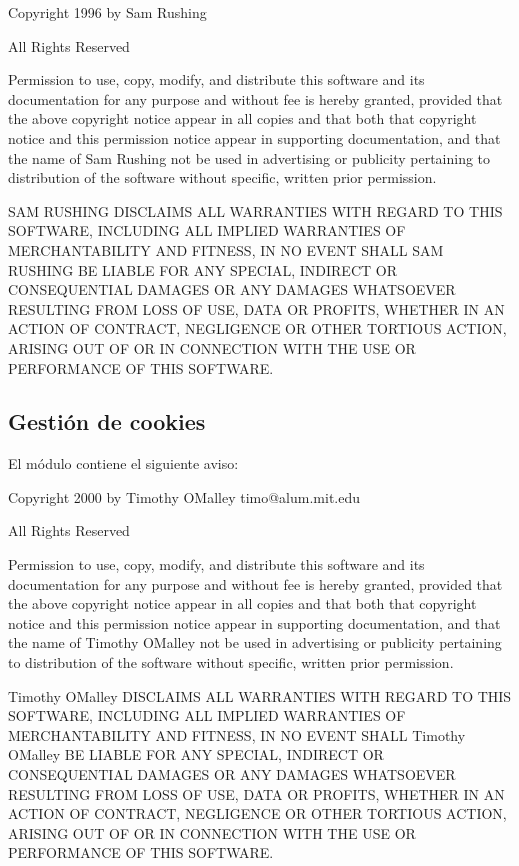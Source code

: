 \documentclass[a4,10pt,spanish]{sphinxmanual}
\begin{document}
\begin{sphinxVerbatim}[commandchars=\\\{\}]
Copyright 1996 by Sam Rushing

                        All Rights Reserved

Permission to use, copy, modify, and distribute this software and
its documentation for any purpose and without fee is hereby
granted, provided that the above copyright notice appear in all
copies and that both that copyright notice and this permission
notice appear in supporting documentation, and that the name of Sam
Rushing not be used in advertising or publicity pertaining to
distribution of the software without specific, written prior
permission.

SAM RUSHING DISCLAIMS ALL WARRANTIES WITH REGARD TO THIS SOFTWARE,
INCLUDING ALL IMPLIED WARRANTIES OF MERCHANTABILITY AND FITNESS, IN
NO EVENT SHALL SAM RUSHING BE LIABLE FOR ANY SPECIAL, INDIRECT OR
CONSEQUENTIAL DAMAGES OR ANY DAMAGES WHATSOEVER RESULTING FROM LOSS
OF USE, DATA OR PROFITS, WHETHER IN AN ACTION OF CONTRACT,
NEGLIGENCE OR OTHER TORTIOUS ACTION, ARISING OUT OF OR IN
CONNECTION WITH THE USE OR PERFORMANCE OF THIS SOFTWARE.
\end{sphinxVerbatim}


\subsection{Gestión de cookies}
\label{\detokenize{license:cookie-management}}
\sphinxAtStartPar
El módulo  contiene el siguiente aviso:

\begin{sphinxVerbatim}[commandchars=\\\{\}]
Copyright 2000 by Timothy O\PYGZsq{}Malley \PYGZlt{}timo@alum.mit.edu\PYGZgt{}

               All Rights Reserved

Permission to use, copy, modify, and distribute this software
and its documentation for any purpose and without fee is hereby
granted, provided that the above copyright notice appear in all
copies and that both that copyright notice and this permission
notice appear in supporting documentation, and that the name of
Timothy O\PYGZsq{}Malley  not be used in advertising or publicity
pertaining to distribution of the software without specific, written
prior permission.

Timothy O\PYGZsq{}Malley DISCLAIMS ALL WARRANTIES WITH REGARD TO THIS
SOFTWARE, INCLUDING ALL IMPLIED WARRANTIES OF MERCHANTABILITY
AND FITNESS, IN NO EVENT SHALL Timothy O\PYGZsq{}Malley BE LIABLE FOR
ANY SPECIAL, INDIRECT OR CONSEQUENTIAL DAMAGES OR ANY DAMAGES
WHATSOEVER RESULTING FROM LOSS OF USE, DATA OR PROFITS,
WHETHER IN AN ACTION OF CONTRACT, NEGLIGENCE OR OTHER TORTIOUS
ACTION, ARISING OUT OF OR IN CONNECTION WITH THE USE OR
PERFORMANCE OF THIS SOFTWARE.
\end{sphinxVerbatim}
\end{document}

